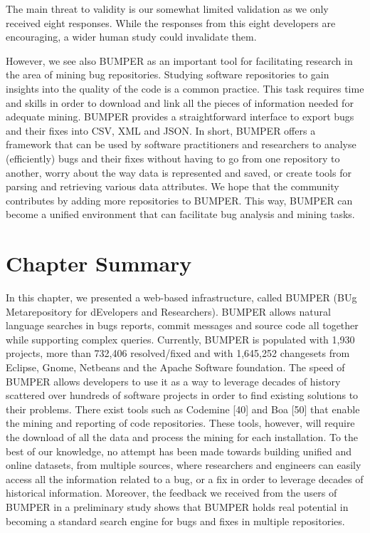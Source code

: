 \documentclass[12pt]{report}
\begin{document}
The main threat to validity is our somewhat limited validation as we
only received eight responses. While the responses from this eight
developers are encouraging, a wider human study could invalidate them.

However, we see also BUMPER as an important tool for facilitating
research in the area of mining bug repositories. Studying software
repositories to gain insights into the quality of the code is a common
practice. This task requires time and skills in order to download and
link all the pieces of information needed for adequate mining. BUMPER
provides a straightforward interface to export bugs and their fixes into
CSV, XML and JSON. In short, BUMPER offers a framework that can be used
by software practitioners and researchers to analyse (efficiently) bugs
and their fixes without having to go from one repository to another,
worry about the way data is represented and saved, or create tools for
parsing and retrieving various data attributes. We hope that the
community contributes by adding more repositories to BUMPER. This way,
BUMPER can become a unified environment that can facilitate bug analysis
and mining tasks.

\section{Chapter Summary}\label{chapter-summary}

In this chapter, we presented a web-based infrastructure, called BUMPER
(BUg Metarepository for dEvelopers and Researchers). BUMPER allows
natural language searches in bugs reports, commit messages and source
code all together while supporting complex queries. Currently, BUMPER is
populated with 1,930 projects, more than 732,406 resolved/fixed and with
1,645,252 changesets from Eclipse, Gnome, Netbeans and the Apache
Software foundation. The speed of BUMPER allows developers to use it as
a way to leverage decades of history scattered over hundreds of software
projects in order to find existing solutions to their problems. There
exist tools such as Codemine {[}40{]} and Boa {[}50{]} that enable the
mining and reporting of code repositories. These tools, however, will
require the download of all the data and process the mining for each
installation. To the best of our knowledge, no attempt has been made
towards building unified and online datasets, from multiple sources,
where researchers and engineers can easily access all the information
related to a bug, or a fix in order to leverage decades of historical
information. Moreover, the feedback we received from the users of BUMPER
in a preliminary study shows that BUMPER holds real potential in
becoming a standard search engine for bugs and fixes in multiple
repositories.
\end{document}
